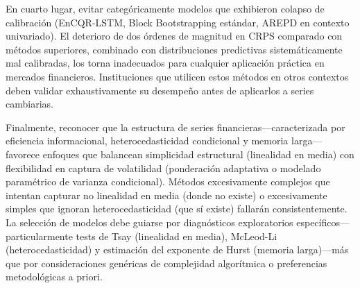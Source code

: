 En cuarto lugar, evitar categóricamente modelos que exhibieron colapso de calibración (EnCQR-LSTM, Block Bootstrapping estándar, AREPD en contexto univariado). El deterioro de dos órdenes de magnitud en CRPS comparado con métodos superiores, combinado con distribuciones predictivas sistemáticamente mal calibradas, los torna inadecuados para cualquier aplicación práctica en mercados financieros. Instituciones que utilicen estos métodos en otros contextos deben validar exhaustivamente su desempeño antes de aplicarlos a series cambiarias.

Finalmente, reconocer que la estructura de series financieras—caracterizada por eficiencia informacional, heterocedasticidad condicional y memoria larga—favorece enfoques que balancean simplicidad estructural (linealidad en media) con flexibilidad en captura de volatilidad (ponderación adaptativa o modelado paramétrico de varianza condicional). Métodos excesivamente complejos que intentan capturar no linealidad en media (donde no existe) o excesivamente simples que ignoran heterocedasticidad (que sí existe) fallarán consistentemente. La selección de modelos debe guiarse por diagnósticos exploratorios específicos—particularmente tests de Tsay (linealidad en media), McLeod-Li (heterocedasticidad) y estimación del exponente de Hurst (memoria larga)—más que por consideraciones genéricas de complejidad algorítmica o preferencias metodológicas a priori.
